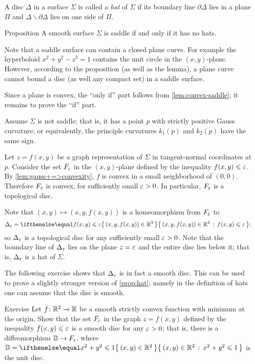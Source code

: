 A disc $\Delta$ in a surface $\Sigma$ is called a \emph{hat} of $\Sigma$
if its boundary line $\partial\Delta$ lies in a plane $\Pi$ and  $\Delta \backslash \partial \Delta $ lies on one side of $\Pi$.

\begin{thm}{Proposition}\label{prop:hat}
A smooth surface $\Sigma$ is saddle if and only if it has no hats.
\end{thm}

Note that a saddle surface can contain a closed plane curve.
For example the hyperboloid $x^2+y^2-z^2=1$ contains the unit circle in the $(x,y)$-plane.
However, according to the proposition (as well as the lemma), a plane curve cannot bound a disc (as well any compact set) in a saddle surface.

Since a plane is convex, the ``only if'' part follows from \ref{lem:convex-saddle};
it remains to prove the ``if'' part.

Assume $\Sigma$ is not saddle; that is, it has a point $p$ with strictly positive Gauss curvature;
or equivalently, the principle curvatures $k_1(p)$ and $k_2(p)$ have the same sign.


Let $z=f(x,y)$ be a graph representation of $\Sigma$ in tangent-normal coordinates at $p$.
Consider the set $F_\varepsilon$ in the $(x,y)$-plane defined by the inequality $f(x,y)\leqslant \varepsilon$.
By \ref{lem:gauss+=>convexity}, $f$ is convex in a small neighborhood of $(0,0)$.
Therefore $F_\varepsilon$ is convex, for sufficiently small $\varepsilon>0$.
In particular, $F_\varepsilon$ is a topological disc.

Note that $(x,y)\mapsto (x,y,f(x,y))$ is a homeomorphism from $F_\varepsilon$
to
\[\Delta_\eps=\set{(x,y,f(x,y))\in \RR^3}{f(x,y)\le \eps};\]
so $\Delta_\varepsilon$ is a topological disc for any sufficiently small $\varepsilon>0$.
Note that the boundary line of $\Delta_\varepsilon$ lies on the plane $z=\varepsilon$ and the entire disc lies below it;
that is, $\Delta_\varepsilon$ is a hat of $\Sigma$.
\qeds

The following exercise shows that $\Delta_\varepsilon$ is in fact a smooth disc.
This can be used to prove a slightly stronger version of \ref{prop:hat};
namely in the definition of hats one can assume that the disc is smooth.

\begin{thm}{Exercise}\label{ex:disc-hat}
Let $f\colon\mathbb{R}^2\to\mathbb{R}$ be a smooth strictly convex function with minimum at the origin.
Show that the set $F_\varepsilon$ in the graph $z=f(x,y)$ defined by the inequality $f(x,y)\leqslant \varepsilon$ is a smooth disc for any $\varepsilon>0$;
that is, there is a diffeomorphism 
$\mathbb{D}\to F_\varepsilon$, where $\DD\z=\set{(x,y)\in\RR^2}{x^2+y^2\le 1}$ is the unit disc.
\end{thm}

